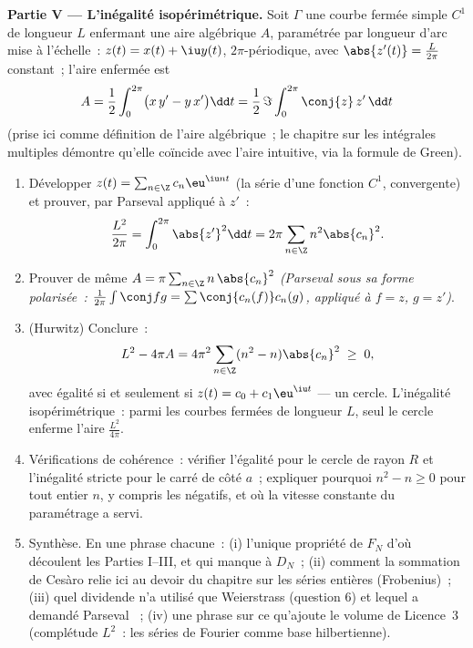 \begin{problem}
\medskip
\noindent\textbf{Partie V --- L'inégalité isopérimétrique.} Soit
$\Gamma$ une courbe fermée simple $C^1$ de longueur $L$ enfermant
une aire algébrique $A$, paramétrée par longueur d'arc mise à
l'échelle~: $z(t) = x(t) + \iu y(t)$, $2\pi$-périodique, avec
$\abs{z'(t)} = \frac{L}{2\pi}$ constant~; l'aire enfermée est
\[
A = \frac12\int_0^{2\pi}\bigl(x\,y' - y\,x'\bigr)\dd t
= \frac{1}{2}\,\Im\int_0^{2\pi}\conj{z}\,z'\,\dd t
\]
(prise ici comme définition de l'aire algébrique~; le chapitre sur
les intégrales multiples démontre qu'elle coïncide avec l'aire
intuitive, via la formule de Green).
\begin{enumerate}[resume]
  \item Développer $z(t) = \sum_{n\in\Z}c_n\eu^{\iu nt}$ (la série
        d'une fonction $C^1$,  convergente) et prouver,
        par Parseval appliqué à $z'$~:
        \[
        \frac{L^2}{2\pi} = \int_0^{2\pi}\abs{z'}^2\dd t
        = 2\pi\sum_{n\in\Z}n^2\abs{c_n}^2 .
        \]
  \item Prouver de même $A = \pi\sum_{n\in\Z}
        n\,\abs{c_n}^2$ \emph{(Parseval sous sa forme polarisée~:
        $\frac{1}{2\pi}\int\conj f g = \sum
        \conj{c_n(f)}c_n(g)$, appliqué à $f = z$, $g = z'$)}.
  \item (Hurwitz) Conclure~:
        \[
        L^2 - 4\pi A = 4\pi^2\sum_{n\in\Z}
        (n^2 - n)\abs{c_n}^2 \;\geq\; 0 ,
        \]
        avec égalité si et seulement si $z(t) = c_0 +
        c_1\eu^{\iu t}$ --- un cercle. L'inégalité isopérimétrique~:
        parmi les courbes fermées de longueur $L$, seul le cercle
        enferme l'aire $\frac{L^2}{4\pi}$.
  \item Vérifications de cohérence~: vérifier l'égalité pour le
        cercle de rayon $R$ et l'inégalité stricte pour le carré de
        côté $a$~; expliquer pourquoi $n^2 - n \geq 0$ pour tout
        entier $n$, y compris les négatifs, et où la vitesse
        constante du paramétrage a servi.
  \item Synthèse. En une phrase chacune~: (i) l'unique propriété de
        $F_N$ d'où découlent les Parties I--III, et qui manque à
        $D_N$~; (ii) comment la sommation de Cesàro relie ici au
        devoir du chapitre sur les séries entières (Frobenius)~;
        (iii) quel dividende n'a utilisé que Weierstrass (question
        6) et lequel a demandé Parseval ~; (iv) une phrase
        sur ce qu'ajoute le volume de Licence~3 (complétude $L^2$~:
        les séries de Fourier comme base hilbertienne).
\end{enumerate}
\end{problem}
